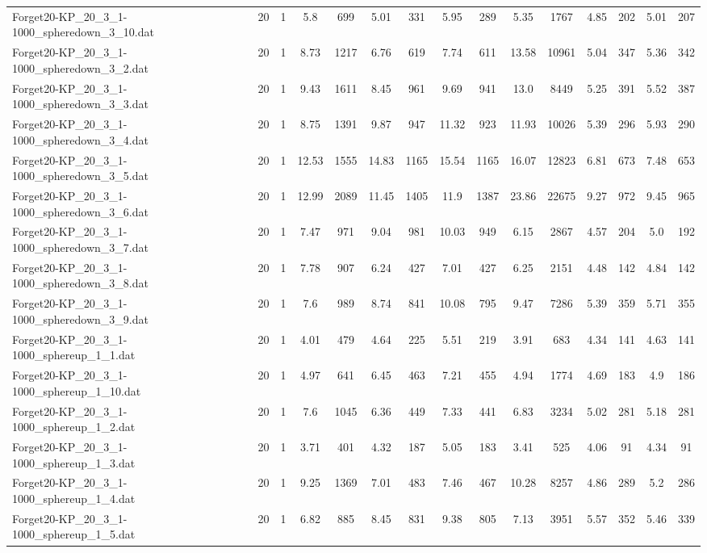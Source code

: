 \begin{table}[!ht]
{\begin{tabular}{lcccccccccccccc}
Forget20-KP\_20\_3\_1-1000\_spheredown\_3\_10.dat & 20 & 1 & 5.8 & 699 & 5.01 & 331 & 5.95 & 289 & 5.35 & 1767 & 4.85 & 202 & 5.01 & 207 \\
Forget20-KP\_20\_3\_1-1000\_spheredown\_3\_2.dat & 20 & 1 & 8.73 & 1217 & 6.76 & 619 & 7.74 & 611 & 13.58 & 10961 & 5.04 & 347 & 5.36 & 342 \\
Forget20-KP\_20\_3\_1-1000\_spheredown\_3\_3.dat & 20 & 1 & 9.43 & 1611 & 8.45 & 961 & 9.69 & 941 & 13.0 & 8449 & 5.25 & 391 & 5.52 & 387 \\
Forget20-KP\_20\_3\_1-1000\_spheredown\_3\_4.dat & 20 & 1 & 8.75 & 1391 & 9.87 & 947 & 11.32 & 923 & 11.93 & 10026 & 5.39 & 296 & 5.93 & 290 \\
Forget20-KP\_20\_3\_1-1000\_spheredown\_3\_5.dat & 20 & 1 & 12.53 & 1555 & 14.83 & 1165 & 15.54 & 1165 & 16.07 & 12823 & 6.81 & 673 & 7.48 & 653 \\
Forget20-KP\_20\_3\_1-1000\_spheredown\_3\_6.dat & 20 & 1 & 12.99 & 2089 & 11.45 & 1405 & 11.9 & 1387 & 23.86 & 22675 & 9.27 & 972 & 9.45 & 965 \\
Forget20-KP\_20\_3\_1-1000\_spheredown\_3\_7.dat & 20 & 1 & 7.47 & 971 & 9.04 & 981 & 10.03 & 949 & 6.15 & 2867 & 4.57 & 204 & 5.0 & 192 \\
Forget20-KP\_20\_3\_1-1000\_spheredown\_3\_8.dat & 20 & 1 & 7.78 & 907 & 6.24 & 427 & 7.01 & 427 & 6.25 & 2151 & 4.48 & 142 & 4.84 & 142 \\
Forget20-KP\_20\_3\_1-1000\_spheredown\_3\_9.dat & 20 & 1 & 7.6 & 989 & 8.74 & 841 & 10.08 & 795 & 9.47 & 7286 & 5.39 & 359 & 5.71 & 355 \\
Forget20-KP\_20\_3\_1-1000\_sphereup\_1\_1.dat & 20 & 1 & 4.01 & 479 & 4.64 & 225 & 5.51 & 219 & 3.91 & 683 & 4.34 & 141 & 4.63 & 141 \\
Forget20-KP\_20\_3\_1-1000\_sphereup\_1\_10.dat & 20 & 1 & 4.97 & 641 & 6.45 & 463 & 7.21 & 455 & 4.94 & 1774 & 4.69 & 183 & 4.9 & 186 \\
Forget20-KP\_20\_3\_1-1000\_sphereup\_1\_2.dat & 20 & 1 & 7.6 & 1045 & 6.36 & 449 & 7.33 & 441 & 6.83 & 3234 & 5.02 & 281 & 5.18 & 281 \\
Forget20-KP\_20\_3\_1-1000\_sphereup\_1\_3.dat & 20 & 1 & 3.71 & 401 & 4.32 & 187 & 5.05 & 183 & 3.41 & 525 & 4.06 & 91 & 4.34 & 91 \\
Forget20-KP\_20\_3\_1-1000\_sphereup\_1\_4.dat & 20 & 1 & 9.25 & 1369 & 7.01 & 483 & 7.46 & 467 & 10.28 & 8257 & 4.86 & 289 & 5.2 & 286 \\
Forget20-KP\_20\_3\_1-1000\_sphereup\_1\_5.dat & 20 & 1 & 6.82 & 885 & 8.45 & 831 & 9.38 & 805 & 7.13 & 3951 & 5.57 & 352 & 5.46 & 339 \\

\end{tabular}}
\end{table}
